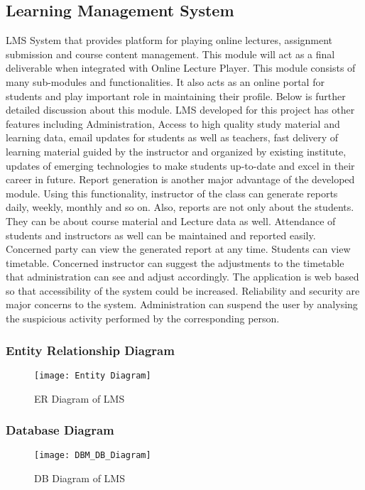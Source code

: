 \subsection{Learning Management System}
LMS System that provides platform for playing online lectures, assignment submission and course content management. This module will act as a final deliverable when integrated with Online Lecture Player. This module consists of many sub-modules and functionalities. It also acts as an online portal for students and play important role in maintaining their profile. Below is further detailed discussion about this module. LMS developed for this project has other features including Administration, Access to high quality study material and learning data, email updates for students as well as teachers, fast delivery of learning material guided by the instructor and organized by existing institute, updates of emerging technologies to make students up-to-date and excel in their career in future. Report generation is another major advantage of the developed module. Using this functionality, instructor of the class can generate reports daily, weekly, monthly and so on. Also, reports are not only about the students. They can be about course material and Lecture data as well. Attendance of students and instructors as well can be maintained and reported easily. Concerned party can view the generated report at any time. Students can view timetable. Concerned instructor can suggest the adjustments to the timetable that administration can see and adjust accordingly. The application is web based so that accessibility of the system could be increased. Reliability and security are major concerns to the system. Administration can suspend the user by analysing the suspicious activity performed by the corresponding person.
\subsubsection{Entity Relationship Diagram}
\begin{figure}[h]
  \centering
  \texttt{[image: Entity Diagram]}
  \caption{ER Diagram of LMS}
\end{figure}
\newpage


\subsubsection{Database Diagram}
\begin{figure}[h]
  \centering
  \texttt{[image: DBM\_DB\_Diagram]}
  \caption{DB Diagram of LMS}
\end{figure}

%
%
%
%
%
%
%
%
%
%
%
%
%
%
%
%
%
%
%
%
%
%
%
%
